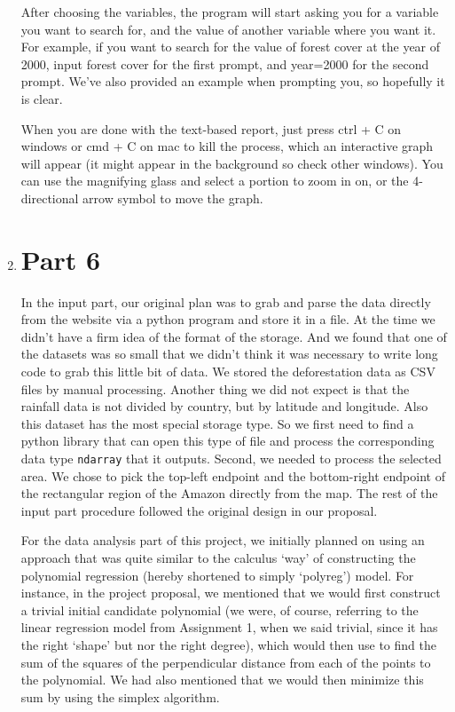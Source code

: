 \documentclass[12pt]{article}
\begin{document}
\begin{enumerate}
\begin{text}
After choosing the variables, the program will start asking you for a variable you want to search for, and the value of another variable where you want it. For example, if you want to search for the value of forest cover at the year of 2000, input forest cover for the first prompt, and year=2000 for the second prompt. We've also provided an example when prompting you, so hopefully it is clear.

When you are done with the text-based report, just press ctrl + C on windows or cmd + C on mac to kill the process, which an interactive graph will appear (it might appear in the background so check other windows). You can use the magnifying glass and select a portion to zoom in on, or the 4-directional arrow symbol to move the graph.

\end{text}



\newpage

\item \section*{Part 6}

\begin{text}

In the input part, our original plan was to grab and parse the data directly from the website via a python program and store it in a file. At the time we didn't have a firm idea of the format of the storage. And we found that one of the datasets was so small that we didn't think it was necessary to write long code to grab this little bit of data. We stored the deforestation data as CSV files by manual processing. Another thing we did not expect is that the rainfall data is not divided by country, but by latitude and longitude. Also this dataset has the most special storage type. So we first need to find a python library that can open this type of file and process the corresponding data type \texttt{ndarray} that it outputs\citep{Pynpy}. Second, we needed to process the selected area. We chose to pick the top-left endpoint and the bottom-right endpoint of the rectangular region of the Amazon directly from the map. The rest of the input part procedure followed the original design in our proposal.

For the data analysis part of this project, we initially planned on using an approach that was quite similar to the calculus `way' of constructing the polynomial regression (hereby shortened to simply `polyreg') model. For instance, in the project proposal, we mentioned that we would first construct a trivial initial candidate polynomial (we were, of course, referring to the linear regression model from Assignment 1, when we said trivial, since it has the right `shape' but nor the right degree), which would then use to find the sum of the squares of the perpendicular distance from each of the points to the polynomial. We had also mentioned that we would then minimize this sum by using the simplex algorithm.


\end{text}
\end{enumerate}
\end{document}
